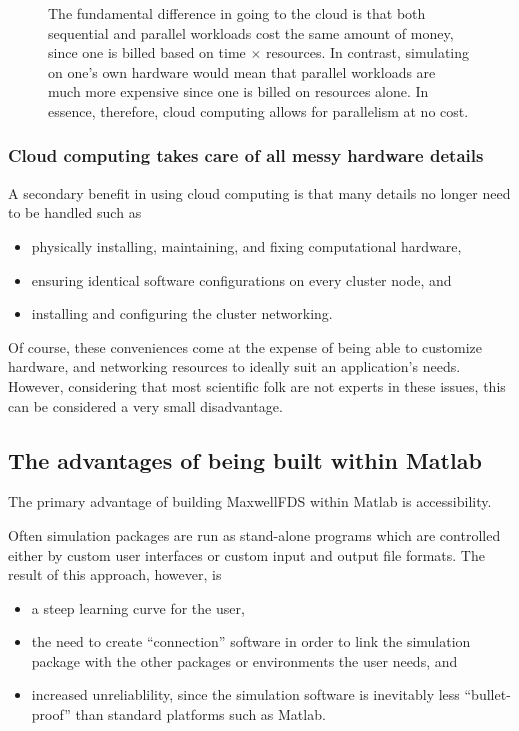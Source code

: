 \documentclass{article}
\newcommand{\MaxwellFDS}{MaxwellFDS }
\newcommand{\BI}{\begin{itemize}\item}
\newcommand{\EI}{\end{itemize}}
\newcommand{\I}{\item}
\begin{document}
\begin{figure}[ht]\begin{center}

\caption{The fundamental difference in going to the cloud
            is that both sequential and parallel workloads
            cost the same amount of money,
            since one is billed based on time $\times$ resources.
        In contrast, simulating on one's own hardware would 
            mean that parallel workloads are much more expensive
            since one is billed on resources alone.
        In essence, therefore, cloud computing allows for 
            parallelism at no cost.}
\label{fig:cloud vs traditional}
\end{center} \end{figure}

\subsubsection{Cloud computing takes care of all messy hardware details}
A secondary benefit in using cloud computing 
    is that many details no longer need to be handled such as
    \BI physically installing, maintaining, and fixing computational hardware,
    \I  ensuring identical software configurations on every cluster node, and 
    \I  installing and configuring the cluster networking. \EI

Of course, these conveniences come at the expense of 
    being able to customize hardware, and networking resources
    to ideally suit an application's needs.
However, considering that most scientific folk
    are not experts in these issues,
    this can be considered a very small disadvantage.

\subsection{The advantages of being built within Matlab}
The primary advantage of building \MaxwellFDS within Matlab is accessibility.

Often simulation packages are run as stand-alone programs
    which are controlled either by custom user interfaces
    or custom input and output file formats.
The result of this approach, however, is 
    \BI a steep learning curve for the user,
    \I  the need to create ``connection'' software
            in order to link the simulation package with
            the other packages or environments the user needs, and  
    \I  increased unreliablility, since the simulation software
            is inevitably less ``bullet-proof'' than standard
            platforms such as Matlab. \EI
    
\end{document}
